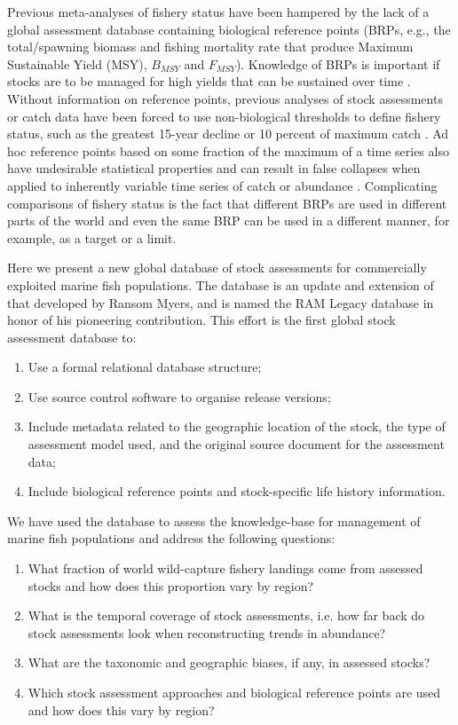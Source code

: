 \documentclass[letterpaper,12pt]{article}
\begin{document}
Previous meta-analyses of fishery status have been hampered by the
lack of a global assessment database containing biological reference
points (BRPs, e.g., the total/spawning biomass and fishing mortality rate that
produce Maximum Sustainable Yield (MSY), $B_{MSY}$ and $F_{MSY}$).  Knowledge of BRPs
is important if stocks are to be managed for high yields that can be
sustained over time \citep{Mace:1994:cjfas}.  Without information on
reference points, previous analyses of stock assessments or catch data
have been forced to use non-biological thresholds to define fishery
status, such as the greatest 15-year decline
\citep{Hutchings:Reynolds:2004:biosci} or 10 percent of maximum catch
\citep{Worm:etal:2006:science}. Ad hoc reference points based on some
fraction of the maximum of a time series also have undesirable
statistical properties and can result in false collapses when applied
to inherently variable time series of catch or abundance
\citep{Wilberg:Miller:2007:science, branch:2008:marpol}.  Complicating
comparisons of fishery status is the fact that different BRPs are used
in different parts of the world and even the same BRP can be used in a
different manner, for example, as a target or a limit. 

Here we present a new global database of stock assessments for
commercially exploited marine fish populations.  The database is an
update and extension of that developed by Ransom Myers, and is named
the RAM Legacy database in honor of his pioneering contribution.  This
effort is the first global stock assessment database to:
\begin{enumerate}
\item Use a formal relational database structure;
\item Use source control software to organise release versions;
\item Include metadata related to the geographic location of the stock, the type of assessment model used, and the original source document for the assessment data;
\item Include biological reference points and stock-specific life history information. 
\end{enumerate}

We have used the database to assess the knowledge-base for management of marine fish populations and address the following questions:
\begin{enumerate}
\item What fraction of world wild-capture fishery landings come from assessed stocks and how does this proportion vary by region?
\item What is the temporal coverage of stock assessments, i.e. how far back do stock assessments look when reconstructing trends in abundance?
\item What are the taxonomic and geographic biases, if any, in assessed stocks?
\item Which stock assessment approaches and biological reference points are used and how does this vary by region?
\end{enumerate}
\end{document}
